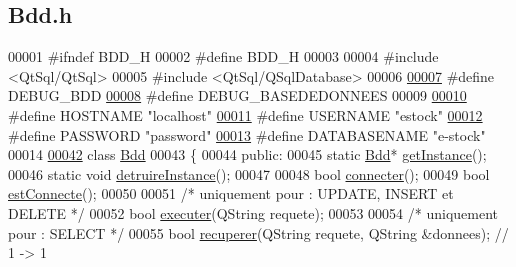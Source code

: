 \hypertarget{_bdd_8h_source}{}\subsection{Bdd.\+h}
\label{_bdd_8h_source}

\begin{DoxyCode}
00001 \textcolor{preprocessor}{#ifndef BDD\_H}
00002 \textcolor{preprocessor}{#define BDD\_H}
00003 
00004 \textcolor{preprocessor}{#include <QtSql/QtSql>}
00005 \textcolor{preprocessor}{#include <QtSql/QSqlDatabase>}
00006 
\hyperlink{_bdd_8h_ae551e5d865c59b5249ff9e5897f83b26}{00007} \textcolor{preprocessor}{#define DEBUG\_BDD}
\hyperlink{_bdd_8h_a9e9e0719c95bed0f3d5ae4cba0c9f5e4}{00008} \textcolor{preprocessor}{#define DEBUG\_BASEDEDONNEES}
00009 
\hyperlink{_bdd_8h_a63ebf0552e7b4b8f37af87147904ffce}{00010} \textcolor{preprocessor}{#define HOSTNAME       "localhost"}
\hyperlink{_bdd_8h_a3a747cf18fa28f0de7920de0f89f5144}{00011} \textcolor{preprocessor}{#define USERNAME       "estock"}
\hyperlink{_bdd_8h_a9e8538fad4eee548302ad9f60e6d47ca}{00012} \textcolor{preprocessor}{#define PASSWORD       "password"}
\hyperlink{_bdd_8h_aed52a1560b7fbe28f212643a9be8a139}{00013} \textcolor{preprocessor}{#define DATABASENAME   "e-stock"}
00014 
\hyperlink{class_bdd}{00042} \textcolor{keyword}{class }\hyperlink{class_bdd}{Bdd}
00043 \{
00044 \textcolor{keyword}{public}:    
00045     \textcolor{keyword}{static} \hyperlink{class_bdd}{Bdd}* \hyperlink{class_bdd_a6f55c29d593da12ca31fad02f5adfe24}{getInstance}();
00046     \textcolor{keyword}{static} \textcolor{keywordtype}{void} \hyperlink{class_bdd_af89fa3ffa107c7859a3964bf032cfdb7}{detruireInstance}();
00047 
00048     \textcolor{keywordtype}{bool} \hyperlink{class_bdd_a1a234e773787295f521d66685149176b}{connecter}();
00049     \textcolor{keywordtype}{bool} \hyperlink{class_bdd_afeb7ee6793705cb94a94560fd53e3e9d}{estConnecte}();
00050 
00051     \textcolor{comment}{/* uniquement pour : UPDATE, INSERT et DELETE */}
00052     \textcolor{keywordtype}{bool} \hyperlink{class_bdd_ab6ae645b4b54ce5df8dc9b422fb39faa}{executer}(QString requete);
00053 
00054     \textcolor{comment}{/* uniquement pour : SELECT */}
00055     \textcolor{keywordtype}{bool} \hyperlink{class_bdd_a8f25d29d309041bbf875700db0efd97b}{recuperer}(QString requete, QString &donnees); \textcolor{comment}{// 1 -> 1}

\end{DoxyCode}
